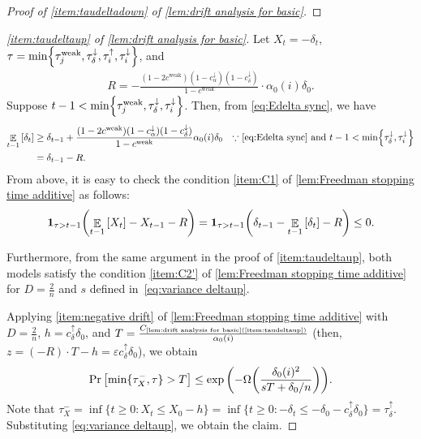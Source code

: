 \documentclass[letterpaper,11pt]{article}
\DeclarePairedDelimiter{\cbra}{\lbrace}{\rbrace} %
\newcommand{\indicator}{\mathbf{1}}
\DeclareMathOperator*{\E}{\mathbb{E}}
\newcommand{\constrefs}[2]{C_{\mbox{\tiny\ref{#1}(\ref{#2})}}}
\newcommand{\cweak}{c^{\mathrm{weak}}}
\newcommand{\calphadown}{c^{\downarrow}_\alpha}
\newcommand{\bounded}{D}
\newcommand{\variance}{s}
\newcommand{\taudeltaup}{\tau^{\uparrow}_\delta}
\newcommand{\cdeltaup}{c^{\uparrow}_\delta}
\newcommand{\taudeltadown}{\tau^{\downarrow}_\delta}
\newcommand{\cdeltadown}{c^{\downarrow}_\delta}
\newcommand{\tauiup}{\tau^{\uparrow}_i}
\newcommand{\tauidown}{\tau^{\downarrow}_i}
\newcommand{\taujweak}{\tau^{\mathrm{weak}}_j}
\newcommand{\drift}{R}
\newcommand{\tauxminus}{\tau_X^-}
\begin{document}
\begin{proof}[Proof of \cref{item:taudeltadown} of \cref{lem:drift analysis for basic}]
  \end{proof}

\begin{proof}[\cref{item:taudeltaup} of \cref{lem:drift analysis for basic}]
Let $X_t = -\delta_t$, $\tau = \min\cbra*{ \taujweak, \taudeltadown, \tauiup, \tauidown}$, and
    \begin{align*}  %
       \drift = 
        -\frac{(1-2\cweak)(1-\calphadown)(1-\cdeltadown)}{1-\cweak}\cdot \alpha_{0}(i)\delta_{0}.
    \end{align*}
Suppose $t-1 <  \min\cbra*{ \taujweak, \taudeltadown, \tauidown}$.
Then, from \cref{eq:Edelta sync}, we have
    \begin{align*}
        \E_{t-1}\qty[ \delta_t ] 
        &\ge \delta_{t-1} + \frac{(1-2\cweak)(1-\calphadown)(1-\cdeltadown)}{1-\cweak}\alpha_{0}(i)\delta_{0}
        &&\text{$\because$ \cref{eq:Edelta sync} and $t-1 <  \min\cbra*{  \taudeltadown, \tauidown}$}\\
        &=\delta_{t-1}-R.
    \end{align*}
    From above, it is easy to check the condition \ref{item:C1} of \cref{lem:Freedman stopping time additive} as follows:
    \begin{align*}
        \indicator_{\tau>t-1}\qty(\E_{t-1}\qty[ X_t ]-X_{t-1}-R)
        =\indicator_{\tau>t-1}\qty(\delta_{t-1}-\E_{t-1}\qty[ \delta_t]-R)
        \leq 0.
    \end{align*}
  
  
  Furthermore, from the same argument in the proof of \cref{item:taudeltaup}, 
  both models satisfy the condition \ref{item:C2'} of \cref{lem:Freedman stopping time additive} for 
  $ \bounded = \frac{2}{n} $ and $ \variance $ defined in~\cref{eq:variance deltaup}.
    

        Applying \cref{item:negative drift} of \cref{lem:Freedman stopping time additive} with 
    $\bounded = \frac{2}{n}$, $h=\cdeltaup \delta_0$, and $T=\frac{\constrefs{lem:drift analysis for basic}{item:taudeltaup}}{\alpha_0(i)}$ 
    (then, $z=(-\drift)\cdot T-h=\varepsilon \cdeltaup \delta_0$), 
    we obtain
    \begin{align*}
        \Pr\qty[\min\{\tauxminus,\tau\}>T]
        \leq \exp\qty(-\Omega\qty(\frac{\delta_0(i)^2}{\variance T+\delta_0/n})).
    \end{align*}
    Note that $\tauxminus=\inf\{t\geq 0: X_t\leq X_0-h\}=\inf\{t\geq 0: -\delta_t\leq -\delta_0-\cdeltaup \delta_0\}=\taudeltaup$.
    Substituting \cref{eq:variance deltaup}, we obtain the claim.
\end{proof}
\end{document}
